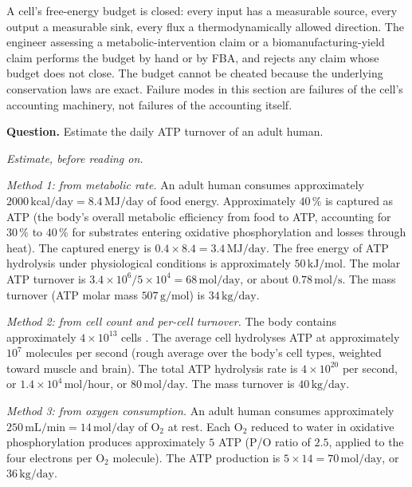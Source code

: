\begin{principle}
A cell's free-energy budget is closed: every input has a measurable
source, every output a measurable sink, every flux a thermodynamically
allowed direction. The engineer assessing a metabolic-intervention
claim or a biomanufacturing-yield claim performs the budget by hand
or by FBA, and rejects any claim whose budget does not close. The
budget cannot be cheated because the underlying conservation laws
are exact. Failure modes in this section are failures of the cell's
accounting machinery, not failures of the accounting itself.
\end{principle}

\begin{estimation}
\textbf{Question.} Estimate the daily ATP turnover of an adult human.

\smallskip
\textit{Estimate, before reading on.}

\smallskip
\emph{Method 1: from metabolic rate.} An adult human consumes
approximately $2000\,\text{kcal}/\text{day} = 8.4\,\text{MJ}/\text{day}$
of food energy. Approximately $40\,\%$ is captured as ATP (the body's
overall metabolic efficiency from food to ATP, accounting for $30\,\%$
to $40\,\%$ for substrates entering oxidative phosphorylation and
losses through heat). The captured energy is
$0.4 \times 8.4 = 3.4\,\text{MJ}/\text{day}$. The free energy of ATP
hydrolysis under physiological conditions is approximately
$50\,\text{kJ}/\text{mol}$. The molar ATP turnover is $3.4 \times 10^6 /
5 \times 10^4 = 68\,\text{mol}/\text{day}$, or about $0.78\,\text{mol}/
\text{s}$. The mass turnover (ATP molar mass $507\,\text{g}/\text{mol}$)
is $34\,\text{kg}/\text{day}$.

\emph{Method 2: from cell count and per-cell turnover.} The body
contains approximately $4 \times 10^{13}$ cells
\cite{paper:v6c02-bianconi-cell-count-2013}. The average cell
hydrolyses ATP at approximately $10^7$ molecules per second (rough
average over the body's cell types, weighted toward muscle and
brain). The total ATP hydrolysis rate is $4 \times 10^{20}$ per
second, or $1.4 \times 10^4\,\text{mol}/\text{hour}$, or
$80\,\text{mol}/\text{day}$. The mass turnover is $40\,\text{kg}/\text{day}$.

\emph{Method 3: from oxygen consumption.} An adult human consumes
approximately $250\,\text{mL}/\text{min} = 14\,\text{mol}/\text{day}$
of O$_2$ at rest. Each O$_2$ reduced to water in oxidative
phosphorylation produces approximately $5$ ATP (P/O ratio of $2.5$,
applied to the four electrons per O$_2$ molecule). The ATP
production is $5 \times 14 = 70\,\text{mol}/\text{day}$, or
$36\,\text{kg}/\text{day}$.


\end{estimation}
